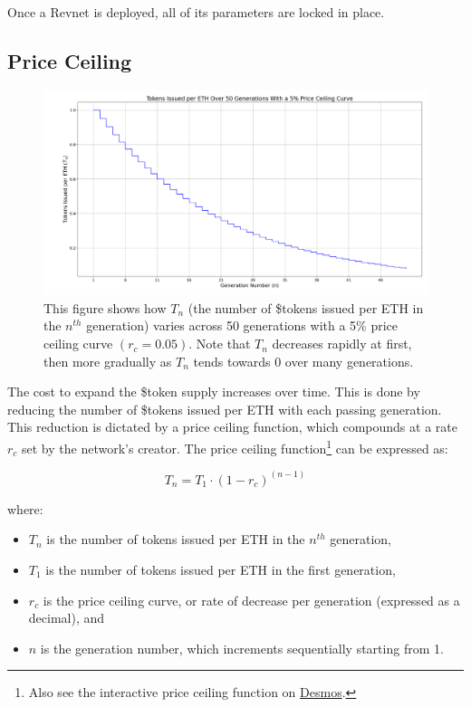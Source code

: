 \documentclass{article}
\begin{document}
Once a Revnet is deployed, all of its parameters are locked in place.

\subsection{Price Ceiling}

\begin{figure}[h]\label{fig:single-ceiling-curve}
  \centering
  \includegraphics[width=\textwidth]{figures/single-ceiling-curve.png}
   \caption{This figure shows how $T_n$ (the number of \$tokens issued per ETH in the $n^{th}$ generation) varies across 50 generations with a 5\% price ceiling curve $(r_c = 0.05)$. Note that $T_n$ decreases rapidly at first, then more gradually as $T_n$ tends towards 0 over many generations.}
\end{figure}

The cost to expand the \$token supply increases over time. This is done by reducing the number of \$tokens issued per ETH with each passing generation. This reduction is dictated by a price ceiling function, which compounds at a rate $r_c$ set by the network's creator. The price ceiling function\footnote{Also see the interactive price ceiling function on \href{https://www.desmos.com/calculator/ey9fhuslwe}{Desmos}.} can be expressed as:

\begin{equation}
  T_n = T_1 \cdot (1 - r_c)^{(n - 1)}
\end{equation}

where:
\begin{itemize}
  \item $T_n$ is the number of tokens issued per ETH in the $n^{th}$ generation,
  \item $T_1$ is the number of tokens issued per ETH in the first generation,
  \item $r_c$ is the price ceiling curve, or rate of decrease per generation (expressed as a decimal), and
  \item $n$ is the generation number, which increments sequentially starting from 1.
\end{itemize}
\end{document}
